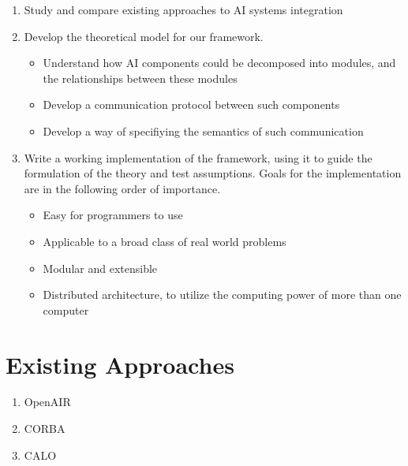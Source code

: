 \documentclass[14pt]{article} %
\begin{document}
\begin{enumerate}
	\item Study and compare existing approaches to AI systems integration
	\item Develop the theoretical model for our framework.
		\begin{itemize}
			\item Understand how AI components could be decomposed into modules, and the relationships between these modules
			\item Develop a communication protocol between such components
			\item Develop a way of specifiying the semantics of such communication
		\end{itemize}
	\item Write a working implementation of the framework, using it to guide the formulation of the theory and test assumptions. Goals for the implementation are in the following order of importance.
		\begin{itemize}
			\item Easy for programmers to use
			\item Applicable to a broad class of real world problems
			\item Modular and extensible
			\item Distributed architecture, to utilize the computing power of more than one computer
		\end{itemize}

\end{enumerate}

\section{Existing Approaches}

\begin {enumerate}
	\item OpenAIR
	\item CORBA
	\item CALO
\end{enumerate}
	
\end{document}
